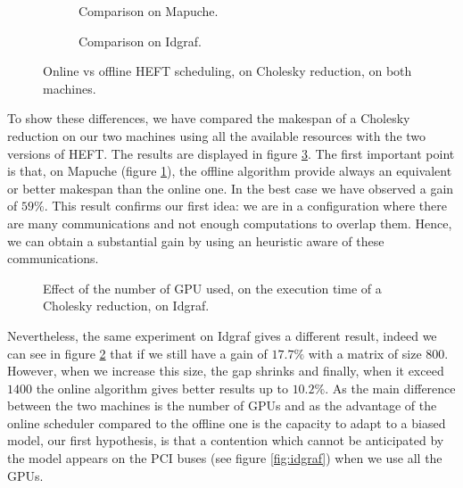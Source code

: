 \documentclass[10pt, conference, compsocconf,pdftex,dvipsnames]{IEEEtran}
\begin{document}
\begin{figure}[bt]
        \centering
        \begin{subfigure}{0.4\textwidth}
            \hspace{-20pt}
            \scalebox{0.7}{
                
            }
            \caption{Comparison on Mapuche.}
            \label{fig:OnOffMapuche}
        \end{subfigure}
        \hspace{15pt}
        \begin{subfigure}{0.55\textwidth}
            \scalebox{0.7}{
                
            }
            \caption{Comparison on Idgraf.}
            \label{fig:OnOffIdgraf}
        \end{subfigure}
    \caption{Online vs offline HEFT scheduling, on Cholesky reduction, on both
    machines.}
    \label{fig:OnOff}
\end{figure}

To show these differences, we have compared the makespan of a Cholesky
reduction on our two machines using all the available resources  with the two
versions of HEFT. The results are displayed in figure \ref{fig:OnOff}. The
first important point is that, on Mapuche (figure \ref{fig:OnOffMapuche}), the
offline algorithm provide always an equivalent or better makespan than the
online one. In the best case we have observed a gain of $59\%$. This
result confirms our first idea: we are in a configuration where there are many
communications and not enough computations to overlap them. Hence, we can
obtain a substantial gain by using an heuristic aware
of these communications. 

\begin{figure}[htb]
        \centering
            \scalebox{0.6}{
                
            }
    \caption{Effect of the number of GPU used, on the execution time of a 
    Cholesky reduction, on Idgraf.}
    \label{fig:Contention}
\end{figure}

Nevertheless, the same experiment on Idgraf gives a different result, indeed
we can see in figure \ref{fig:OnOffIdgraf} that if we still have a gain of
$17.7\%$ with a matrix of size $800$. However, when we increase this size, the
gap shrinks and finally, when it exceed $1400$ the online algorithm gives
better results up to $10.2\%$. As the main difference between the two machines
is the number of GPUs and as the advantage of the online scheduler compared to
the offline one is the capacity to adapt to a biased model, our first
hypothesis, is that a contention which cannot be anticipated by the model
appears on the PCI buses (see figure \ref{fig:idgraf}) when we use all the
GPUs. 
\end{document}
